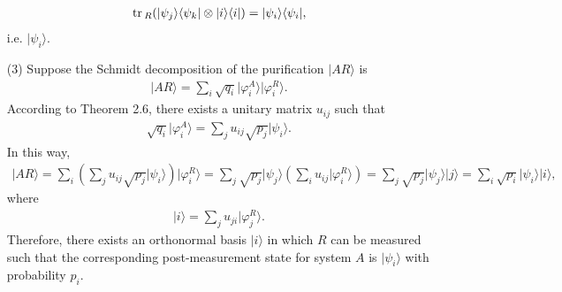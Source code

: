 \documentclass[en]{sol-man}
\begin{document}
\begin{sol}
\begin{itemize}
        \begin{align}
            \,\mathrm{tr}\,_R(\lvert\psi_j\rangle\langle\psi_k\rvert\otimes\lvert i\rangle\langle i\rvert)=\lvert\psi_i\rangle\langle\psi_i\rvert,
        \end{align}
        i.e. $\lvert\psi_i\rangle$.
        \item[(3)] Suppose the Schmidt decomposition of the purification $\lvert AR\rangle$ is
        \begin{align}
            \lvert AR\rangle=\sum_i\sqrt{q_i}\lvert\varphi_i^A\rangle\lvert\varphi_i^R\rangle.
        \end{align}
        According to Theorem 2.6, there exists a unitary matrix $u_{ij}$ such that
        \begin{align}
            \sqrt{q_i}\lvert\varphi_i^A\rangle=\sum_{j}u_{ij}\sqrt{p_j}\lvert\psi_i\rangle.
        \end{align}
        In this way,
        \begin{align}
            \lvert AR\rangle=\sum_i\left(\sum_{j}u_{ij}\sqrt{p_j}\lvert\psi_i\rangle\right)\lvert\varphi_i^R\rangle=\sum_j\sqrt{p_j}\lvert\psi_j\rangle\left(\sum_iu_{ij}\lvert\varphi_i^R\rangle\right)=\sum_j\sqrt{p_j}\lvert\psi_j\rangle\lvert j\rangle=\sum_i\sqrt{p_i}\lvert\psi_i\rangle\lvert i\rangle,
        \end{align}
        where
        \begin{align}
            \lvert i\rangle=\sum_ju_{ji}\lvert\varphi_j^R\rangle.
        \end{align}
        Therefore, there exists an orthonormal basis $\lvert i\rangle$ in which $R$ can be measured such that the corresponding post-measurement state for system $A$ is $\lvert\psi_i\rangle$ with probability $p_i$.
    \end{itemize}
\end{sol}
\end{document}
